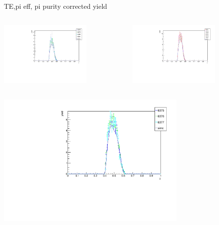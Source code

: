 \begin{frame}{TE,pi eff, pi purity corrected yield}
\begin{columns}
\begin{column}[T]{0.5\textwidth}
\includegraphics[width = 0.7\textwidth]{results/yield/check/yieldcheck_260_neg.pdf}
\end{column}
\begin{column}[T]{0.5\textwidth}
\includegraphics[width = 0.7\textwidth]{results/yield/check/yieldcheck_260_pos.pdf}
\end{column}
\end{columns}
\begin{columns}
\begin{column}[T]{0.5\textwidth}
\includegraphics[width = 0.7\textwidth]{results/yield/check/yieldcheck_250_neg.pdf}

\end{column}
\end{columns}
\end{frame}

